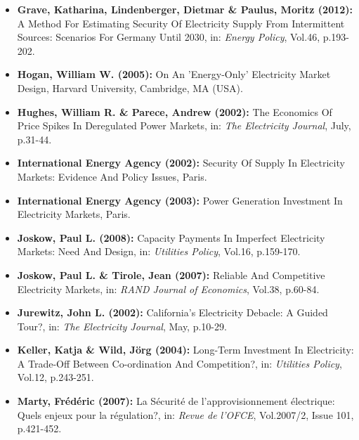 \documentclass[11pt,a4paper,english]{scrreprt}
\begin{document}
\begin{itemize}
	\item[\Rectsteel] \textbf{Grave, Katharina, Lindenberger, Dietmar \&
Paulus, Moritz (2012):} A Method For Estimating Security Of Electricity Supply
From Intermittent Sources: Scenarios For Germany Until 2030, in: \textsl{Energy
Policy}, Vol.46, p.193-202.


	\item[\Rectsteel] \textbf{Hogan, William W. (2005):} On An
'Energy-Only' Electricity Market Design, Harvard University, Cambridge, MA
(USA).


	\item[\Rectsteel] \textbf{Hughes, William R. \& Parece, Andrew (2002):}
The Economics Of Price Spikes In Deregulated Power Markets, in: \textsl{The
Electricity Journal}, July, p.31-44.


	\item [\Rectsteel] \textbf{International Energy Agency (2002):} Security
Of Supply In Electricity Markets: Evidence And Policy Issues, Paris.


	\item [\Rectsteel] \textbf{International Energy Agency (2003):} Power
Generation Investment In Electricity Markets, Paris.


	\item [\Rectsteel] \textbf{Joskow, Paul L. (2008):} Capacity Payments In
Imperfect Electricity Markets: Need And Design, in: \textsl{Utilities Policy},
Vol.16, p.159-170.


	\item [\Rectsteel] \textbf{Joskow, Paul L. \& Tirole, Jean (2007):}
Reliable And Competitive Electricity Markets, in: \textsl{RAND Journal of
Economics}, Vol.38, p.60-84.


	\item [\Rectsteel] \textbf{Jurewitz, John L. (2002):} California's
Electricity Debacle: A Guided Tour?, in: \textsl{The Electricity Journal}, May,
p.10-29.


	\item [\Rectsteel] \textbf{Keller, Katja \& Wild, J\"org (2004):}
Long-Term Investment In Electricity: A Trade-Off Between Co-ordination And
Competition?, in: \textsl{Utilities Policy}, Vol.12, p.243-251.



	\item [\Rectsteel] \textbf{Marty, Fr\'{e}d\'{e}ric (2007):} La
S\'{e}curit\'{e} de l'approvisionnement \'{e}lectrique: Quels enjeux pour la
r\'{e}gulation?, in: \textsl{Revue de l'OFCE}, Vol.2007/2, Issue 101,
p.421-452. 


\end{itemize}
\end{document}
